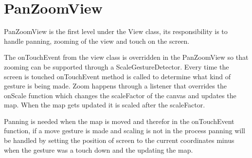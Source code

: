 \section{PanZoomView}

PanZoomView is the first level under the View class, its responsibility is to handle panning, zooming of the view and touch on the screen.

The onTouchEvent from the view class is overridden in the PanZoomView so that zooming can be supported through a ScaleGestureDetector. Every time the screen is touched onTouchEvent method is called to determine what kind of gesture is being made. Zoom happens through a listener that overrides the onScale function which changes the scaleFactor of the canvas and updates the map. When the map gets updated it is scaled after the scaleFactor. 

Panning is needed when the map is moved and therefor in the onTouchEvent function, if a move gesture is made and scaling is not in the process panning will be handled by setting the position of screen to the current coordinates minus when the gesture was a touch down and the updating the map.
